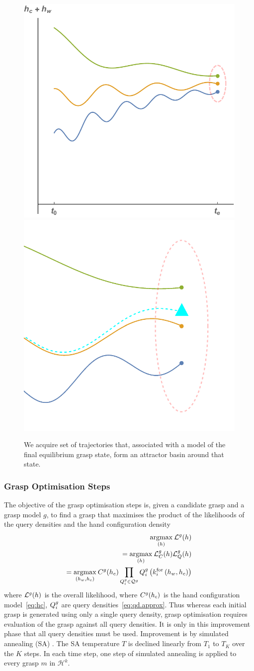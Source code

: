 \begin{figure}

 \includegraphics[width=0.45\linewidth]{images/config_space_plots/2_basin_of_attraction}
  \includegraphics[width=0.45\linewidth]{images/config_space_plots/5_trajectory_adaptation}
 \caption{{We acquire set of trajectories that, associated with a model of the final equilibrium grasp state, form an attractor basin around that state.}}
  \label{fig:reaches}
\end{figure}

\subsubsection{Grasp Optimisation Steps}
The objective of the grasp optimisation steps is, given a candidate grasp and a grasp model $g$, to find a grasp that maximises the product of the likelihoods of the query densities and the hand configuration density
\begin{align}
\underset{(h)}{\operatorname{argmax}}\medspace  \mathcal{L}^g(h) & \\
 = \underset{(h)}{\operatorname{argmax}}\medspace  \mathcal{L}^g_C(h) \mathcal{L}^g_Q(h) \\
 = \underset{(h_w, h_c)}{\operatorname{argmax}}\medspace   C^{g}(h_c) \prod_{Q_i^g \in \mathcal{Q}^g} Q_i^g\left(k_{i}^{\mathrm{for}}\left(h_w, h_c\right)\right)
\label{eq:grasping.product}
\end{align}
where ${\cal L}^g(h)$ is the overall likelihood, where $C^g(h_c)$ is the hand configuration model~\eqref{eq:hc}, $Q_i^g$ are query densities~\eqref{eq:qd.approx}. Thus whereas each initial grasp is generated using only a single query density, grasp optimisation requires evaluation of the grasp against all query densities. It is only in this improvement phase that all query densities must be used.
 Improvement is by simulated annealing (SA) \cite{kirkpatrick83optimizationby}. The SA temperature $T$ is declined linearly from $T_{1}$ to $T_{K}$ over the $K$ steps. In each time step, one step of simulated annealing is applied to every grasp $m$ in $\mathcal{H}^k$.